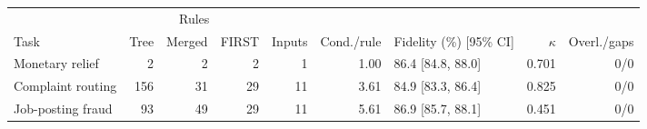 \begin{tabular}{@{}lrrrrrlrr@{}}
\toprule
 & \multicolumn{3}{c}{Rules} & & & & & \\ \cmidrule(lr){2-4}
Task & Tree & Merged & FIRST & Inputs & Cond./rule & Fidelity (\%) [95\% CI] & $\kappa$ & Overl./gaps \\
\midrule
Monetary relief & 2 & 2 & 2 & 1 & 1.00 & 86.4 [84.8, 88.0] & 0.701 & 0/0 \\
Complaint routing & 156 & 31 & 29 & 11 & 3.61 & 84.9 [83.3, 86.4] & 0.825 & 0/0 \\
Job-posting fraud & 93 & 49 & 29 & 11 & 5.61 & 86.9 [85.7, 88.1] & 0.451 & 0/0 \\
\bottomrule
\end{tabular}
